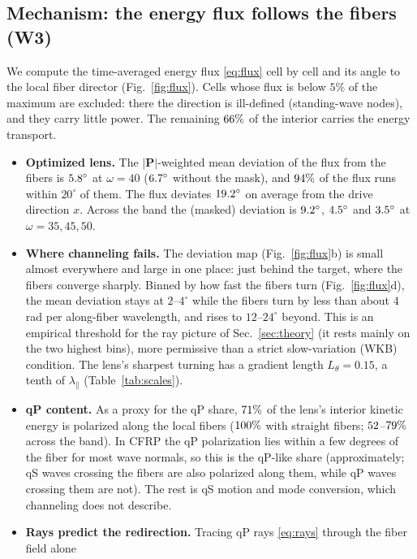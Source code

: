 \subsection{Mechanism: the energy flux follows the fibers (W3)}\label{sec:flux}
We compute the time-averaged energy flux \eqref{eq:flux} cell by cell and its angle to the local fiber
director (Fig.~\ref{fig:flux}). Cells whose flux is below $5\%$ of the maximum are excluded: there the
direction is ill-defined (standing-wave nodes), and they carry little power. The remaining
$66\%$ of the interior carries the energy transport.
\begin{itemize}[itemsep=1pt]
\item \textbf{Optimized lens.} The $|\bm P|$-weighted mean deviation of the flux from the fibers is
  $5.8^\circ$ at $\omega=40$ ($6.7^\circ$ without the mask), and $94\%$ of the
  flux runs within $20^\circ$ of them. The flux deviates $19.2^\circ$ on average from the drive
  direction $x$. Across the band the (masked) deviation is $9.2^\circ$, $4.5^\circ$
  and $3.5^\circ$ at $\omega=35,45,50$.
\item \textbf{Where channeling fails.} The deviation map (Fig.~\ref{fig:flux}b) is small almost everywhere
  and large in one place: just behind the target, where the fibers converge sharply. Binned by how fast
  the fibers turn (Fig.~\ref{fig:flux}d), the mean deviation stays at $2$--$4^\circ$ while the fibers turn
  by less than about $4$\,rad per along-fiber wavelength, and rises to $12$--$24^\circ$ beyond. This is an
  empirical threshold for the ray picture of Sec.~\ref{sec:theory} (it rests mainly on the two highest bins),
  more permissive than a strict slow-variation (WKB) condition. The lens's sharpest turning has a
  gradient length $L_\theta=0.15$, a tenth of $\lambda_\parallel$ (Table~\ref{tab:scales}).
\item \textbf{qP content.} As a proxy for the qP share, $71\%$ of the lens's interior kinetic energy is
  polarized along the local fibers ($100\%$ with straight fibers; $52$--$79\%$ across the band). In CFRP the qP
  polarization lies within a few degrees of the fiber for most wave normals, so this is the qP-like
  share (approximately; qS waves crossing the fibers are also polarized along them, while qP waves crossing
  them are not). The rest is qS
  motion and mode conversion, which channeling does not describe.
\item \textbf{Rays predict the redirection.} Tracing qP rays \eqref{eq:rays} through the fiber field alone

\end{itemize}

